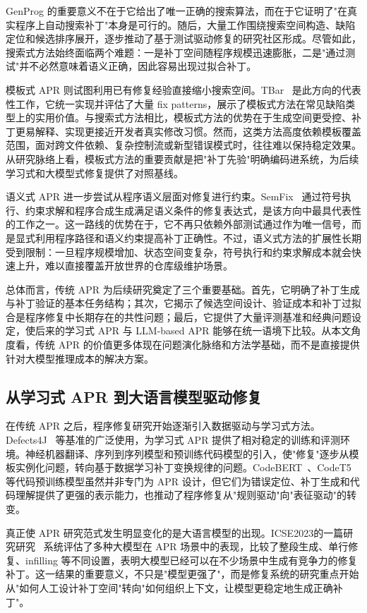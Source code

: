 GenProg 的重要意义不在于它给出了唯一正确的搜索算法，而在于它证明了"在真实程序上自动搜索补丁"本身是可行的。随后，大量工作围绕搜索空间构造、缺陷定位和候选排序展开，逐步推动了基于测试驱动修复的研究社区形成。尽管如此，搜索式方法始终面临两个难题：一是补丁空间随程序规模迅速膨胀，二是"通过测试"并不必然意味着语义正确，因此容易出现过拟合补丁。

模板式 APR 则试图利用已有修复经验直接缩小搜索空间。TBar~\cite{liu2019tbar} 是此方向的代表性工作，它统一实现并评估了大量 fix patterns，展示了模板式方法在常见缺陷类型上的实用价值。与搜索式方法相比，模板式方法的优势在于生成空间更受控、补丁更易解释、实现更接近开发者真实修改习惯。然而，这类方法高度依赖模板覆盖范围，面对跨文件依赖、复杂控制流或新型错误模式时，往往难以保持稳定效果。从研究脉络上看，模板式方法的重要贡献是把"补丁先验"明确编码进系统，为后续学习式和大模型式修复提供了对照基线。

语义式 APR 进一步尝试从程序语义层面对修复进行约束。SemFix~\cite{nguyen2013semfix} 通过符号执行、约束求解和程序合成生成满足语义条件的修复表达式，是该方向中最具代表性的工作之一。这一路线的优势在于，它不再只依赖外部测试通过作为唯一信号，而是显式利用程序路径和语义约束提高补丁正确性。不过，语义式方法的扩展性长期受到限制：一旦程序规模增加、状态空间变复杂，符号执行和约束求解成本就会快速上升，难以直接覆盖开放世界的仓库级维护场景。

总体而言，传统 APR 为后续研究奠定了三个重要基础。首先，它明确了补丁生成与补丁验证的基本任务结构；其次，它揭示了候选空间设计、验证成本和补丁过拟合是程序修复中长期存在的共性问题；最后，它提供了大量评测基准和经典问题设定，使后来的学习式 APR 与 LLM-based APR 能够在统一语境下比较。从本文角度看，传统 APR 的价值更多体现在问题演化脉络和方法学基础，而不是直接提供针对大模型推理成本的解决方案。

\subsection{从学习式 APR 到大语言模型驱动修复}

在传统 APR 之后，程序修复研究开始逐渐引入数据驱动与学习式方法。Defects4J~\cite{chen2021evaluating} 等基准的广泛使用，为学习式 APR 提供了相对稳定的训练和评测环境。神经机器翻译、序列到序列模型和预训练代码模型的引入，使"修复"逐步从模板实例化问题，转向基于数据学习补丁变换规律的问题。CodeBERT~\cite{feng2020codebert}、CodeT5~\cite{wang2021codet5} 等代码预训练模型虽然并非专门为 APR 设计，但它们为错误定位、补丁生成和代码理解提供了更强的表示能力，也推动了程序修复从"规则驱动"向"表征驱动"的转变。

真正使 APR 研究范式发生明显变化的是大语言模型的出现。ICSE2023的一篇研究研究~\cite{xia2023automated} 系统评估了多种大模型在 APR 场景中的表现，比较了整段生成、单行修复、infilling 等不同设置，表明大模型已经可以在不少场景中生成有竞争力的修复补丁。这一结果的重要意义，不只是"模型更强了"，而是修复系统的研究重点开始从"如何人工设计补丁空间"转向"如何组织上下文，让模型更稳定地生成正确补丁"。

